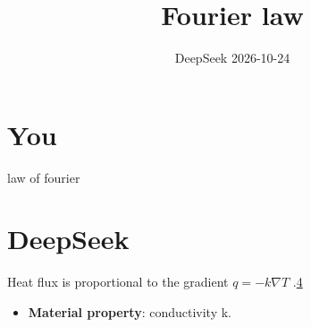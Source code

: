 \documentclass[11pt,a4paper]{article}
\title{Fourier law}
\date{DeepSeek \textperiodcentered{} 2026-10-24}
\begin{document}
\maketitle

\section*{You}

law of fourier


\section*{DeepSeek}

Heat flux is proportional to the gradient $q = -k\nabla T$ .\href{https://example.org/heat}{4}

\begin{itemize}
  \item \textbf{Material property}: conductivity k.
\end{itemize}
\end{document}
